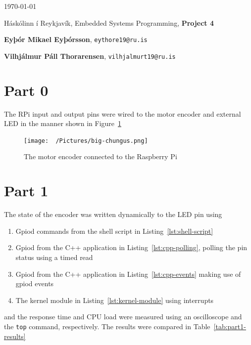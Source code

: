 \documentclass{article}
\begin{document}
\today \par
\vspace{.5cm}
\noindent Háskólinn í Reykjavík, Embedded Systems Programming, \textbf{Project 4} \par
\noindent \textbf{Eyþór Mikael Eyþórsson}, \texttt{eythore19@ru.is}\par
\noindent \textbf{Vilhjálmur Páll Thorarensen}, \texttt{vilhjalmurt19@ru.is}\par

\section*{Part 0}
The RPi input and output pins were wired to the motor encoder and external LED
in the manner shown in Figure~\ref{fig:rpi-encoder-connection}
\begin{figure}[h]
	\begin{center}
		\texttt{[image: ~/Pictures/big-chungus.png]}
	\end{center}
	\caption{The motor encoder connected to the Raspberry
		Pi}\label{fig:rpi-encoder-connection}
\end{figure}

\section*{Part 1}

The state of the encoder was written dynamically to the LED pin using \begin{enumerate}
	\item Gpiod commands from the shell script in Listing~\ref{lst:shell-script}
	\item Gpiod from the C++ application in Listing~\ref{lst:cpp-polling}, polling the pin status using a timed read
	\item Gpiod from the C++ application in Listing~\ref{lst:cpp-events} making use of gpiod events
	\item The kernel module in Listing~\ref{lst:kernel-module} using interrupts
\end{enumerate} and the response time and CPU load were measured using an oscilloscope and
the \texttt{top} command, respectively. The results were compared in
Table~\ref{tab:part1-results}
\end{document}
